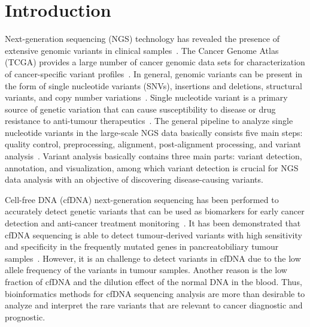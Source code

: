 \documentclass[a4,center,fleqn]{NAR}
\begin{document}
\section{Introduction}
Next-generation sequencing (NGS) technology has revealed the presence of extensive genomic variants in clinical samples~\citep{koboldt2013next}.
The Cancer Genome Atlas (TCGA) provides a large number of cancer genomic data sets for characterization of cancer-specific variant profiles~\citep{cancer2012comprehensive}.
In general, genomic variants can be present in the form of single nucleotide variants (SNVs), insertions and deletions, structural variants, and copy number variations~\citep{Bao2014}.
Single nucleotide variant is a primary source of genetic variation that can cause susceptibility to disease or drug resistance to anti-tumour therapeutics~\citep{kessler2014resistance}.
The general pipeline to analyze single nucleotide variants in the large-scale NGS data basically consists five main steps: quality control, preprocessing, alignment, post-alignment processing, and variant analysis~\citep{pabinger2014survey, Bao2014}.
Variant analysis basically contains three main parts: variant detection, annotation, and visualization, among which variant detection is crucial for NGS data analysis with an objective of discovering disease-causing variants.


Cell-free DNA (cfDNA) next-generation sequencing has been performed to accurately detect genetic variants that can be used as biomarkers for early cancer detection and anti-cancer treatment monitoring~\citep{schwarzenbach2011cell, zhou2014pilot}.
It has been demonstrated that cfDNA sequencing is able to detect tumour-derived variants with high sensitivity and specificity in the frequently mutated genes in pancreatobiliary tumour samples~\citep{zill2015cell}.
However, it is an challenge to detect variants in cfDNA due to the low allele frequency of the variants in tumour samples.
Another reason is the low fraction of cfDNA and the dilution effect of the normal DNA in the blood. 
Thus, bioinformatics methods for cfDNA sequencing analysis are more than desirable to analyze and interpret the rare variants that are relevant to cancer diagnostic and prognostic.
\end{document}
